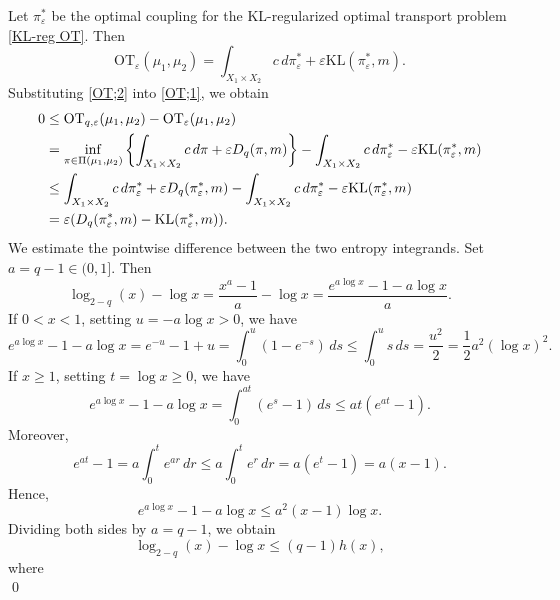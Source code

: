 \documentclass[a4paper,11pt]{article}
\theoremstyle{plain}
\theoremstyle{definition}
\theoremstyle{remark}
\theoremstyle{plain}
\newenvironment{pf}[1]
{{\noindent\textbf{Proof of #1.}}}{\hfill \qed}
\numberwithin{equation}{section}
\newcommand{\ep}{\varepsilon}
\newcommand{\1}{\mbox{1}\hspace{-0.25em}\mbox{l}} %
\begin{document}
\begin{pf}{Theorem \ref{thm;2}}
Let $\pi_\ep^*$ be the optimal coupling for the KL-regularized optimal transport problem \eqref{KL-reg OT}. Then
\begin{equation}\label{OT;2}
  \mathrm{OT}_{\ep}(\mu_1, \mu_2)
  = \int_{X_1 \times X_2} c\, d\pi_\ep^* + \ep \mathrm{KL}(\pi_\ep^*, m).
\end{equation}
Substituting \eqref{OT;2} into \eqref{OT;1}, we obtain
\begin{align}
  0 &\leq \mathrm{OT}_{q,\ep}(\mu_1, \mu_2) - \mathrm{OT}_{\ep}(\mu_1, \mu_2) \notag \\
  &= \inf_{\pi \in \Pi(\mu_1, \mu_2)}
  \left\{
    \int_{X_1 \times X_2} c\, d\pi + \ep D_q(\pi, m)
  \right\} 
  - \int_{X_1 \times X_2} c\, d\pi_\ep^* - \ep \mathrm{KL}(\pi_\ep^*, m) \notag \\
  &\leq \int_{X_1 \times X_2} c\, d\pi_\ep^* + \ep D_q(\pi_\ep^*, m)
  - \int_{X_1 \times X_2} c\, d\pi_\ep^* - \ep \mathrm{KL}(\pi_\ep^*, m) \notag \\
  &= \ep (D_q(\pi_\ep^*, m) - \mathrm{KL}(\pi_\ep^*, m)). \label{OT;3}
\end{align}
We estimate the pointwise difference between the two entropy integrands.
Set $a = q-1 \in (0,1]$. Then
\begin{equation*}
\log_{2-q}(x) - \log x
= \frac{x^a - 1}{a} - \log x
= \frac{e^{a \log x} - 1 - a \log x}{a}.
\end{equation*}
If $0 < x < 1$, setting $u=-a\log x>0$, we have
\begin{equation*}
e^{a\log x}-1-a\log x
= e^{-u}-1+u
= \int_0^u (1-e^{-s})\,ds
\leq \int_0^u s\,ds = \dfrac{u^2}{2} = \dfrac{1}{2}a^2(\log x)^2.
\end{equation*}
If $x \geq 1$, setting $t=\log x \geq 0$, we have
\begin{equation*}
e^{a\log x}-1-a\log x
= \int_0^{at}(e^s-1)\,ds
\leq at(e^{at}-1).
\end{equation*}
Moreover,
\begin{equation*}
e^{at}-1
= a\int_0^t e^{ar}\,dr
\leq a\int_0^t e^r\,dr
= a(e^t-1)
= a(x-1).
\end{equation*}
Hence,
\begin{equation*}
e^{a\log x}-1-a\log x
\leq a^2(x-1)\log x.
\end{equation*}
Dividing both sides by $a=q-1$, we obtain
\begin{equation}\label{ineq;Tsallis-to-KL ineq}
\log_{2-q}(x)-\log x
\leq (q-1)h(x),
\end{equation}
where
\begin{equation*}

\end{equation*}
\end{pf}
\end{document}

